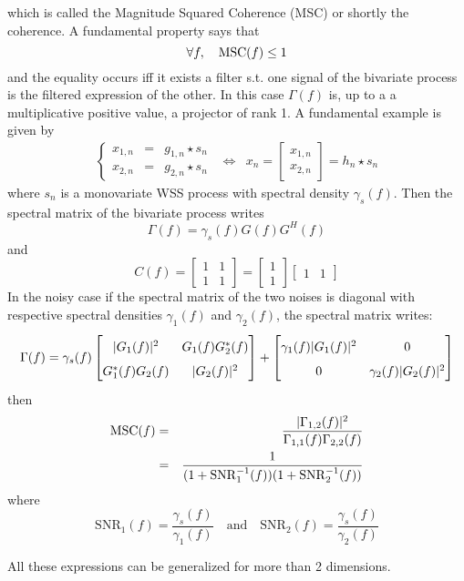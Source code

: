 which is called the Magnitude Squared Coherence (MSC) or shortly the coherence. A fundamental property says that 
$$
 \forall f, \quad \mathrm{MSC}(f)\leq 1
$$
and the equality occurs iff it exists a filter s.t. one signal of the bivariate process is the filtered expression  of the other. In this case $\Gamma(f)$ is, up to a a multiplicative positive value, a projector of rank 1. A fundamental example is given by
$$
\begin{array}{ccc}
\left\{
 \begin{array}{rcl}
 x_{1,n}&=&g_{1,n}\star s_{n}
 \\
 x_{2,n}&=&g_{2,n}\star s_{n}
\end{array}
\right.
&\Leftrightarrow&
x_{n}=\begin{bmatrix}
x_{1,n}\\ x_{2,n} 
\end{bmatrix} = h_{n} \star s_{n}
\end{array}
$$
where $s_{n}$ is a monovariate WSS process with spectral density $\gamma_{s}(f)$. Then the spectral matrix of the bivariate process writes 
$$
 \Gamma(f)=\gamma_{s}(f)G(f)G^{H}(f)
$$
and
$$
C(f) 
= \begin{bmatrix}1&1\\1&1\end{bmatrix}
= \begin{bmatrix}1\\1\end{bmatrix}
  \begin{bmatrix}1&1\end{bmatrix}
$$
In the noisy case if the spectral matrix of the two noises is diagonal with respective spectral densities $\gamma_{1}(f)$ and  $\gamma_{2}(f)$, the spectral matrix writes:
$$
 \Gamma(f) = \gamma_{s}(f)
 \renewcommand\arraystretch{1.6}
 \begin{bmatrix}
| G_{1}(f)|^{2}& G_{1}(f)G_{2}^{*}(f)
 \\
 G_{1}^{*}(f)G_{2}(f)& | G_{2}(f)|^{2}
 \end{bmatrix}
 +
  \begin{bmatrix}
 \gamma_{1}(f)| G_{1}(f)|^{2}& 0
 \\
 0& \gamma_{2}(f)| G_{2}(f)|^{2}
 \end{bmatrix}
$$
then
\begin{eqnarray*}
 \mathrm{MSC}(f) 
 &=& 
 \frac{|\Gamma_{1,2}(f)|^{2}}{\Gamma_{1,1}(f)\Gamma_{2,2}(f)}
 \\
 &=&
 \frac{1}
   {(1+\mathrm{SNR}_{1}^{-1}(f))(1+\mathrm{SNR}_{2}^{-1}(f))}
\end{eqnarray*}
where
$$
 \mathrm{SNR}_{1}(f)=\frac{\gamma_{s}(f)}{\gamma_{1}(f)}
 \quad\text{and}\quad
 \mathrm{SNR}_{2}(f)=\frac{\gamma_{s}(f)}{\gamma_{2}(f)}
$$

All these expressions can be generalized for more than 2 dimensions.
